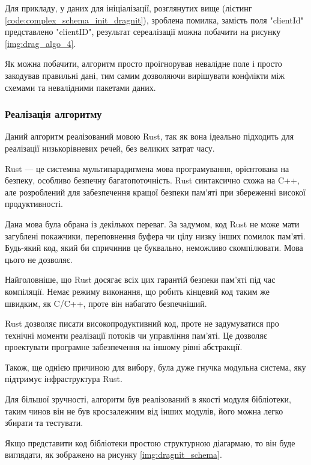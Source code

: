\documentclass{lib/styles/default-style}
\begin{document}
    Для прикладу, у даних для ініціалізації, розглянутих вище (лістинг \ref{code:complex_schema_init_dragnit}), зроблена помилка,
    замість поля "clientId" представлено "clientID", результат сереалізації можна побачити на рисунку \ref{img:drag_algo_4}.


    Як можна побачити, алгоритм просто проігнорував невалідне поле і просто закодував правильні дані, тим самим дозволяючи
    вирішувати конфлікти між схемами та невалідними пакетами даних.

    \subsubsection{Реалізація алгоритму}

    Даний алгоритм реалізований мовою Rust, так як вона ідеально підходить для реалізації низькорівневих речей, без великих затрат часу.

    Rust --- це системна мультипарадигмена мова програмування, орієнтована на безпеку, особливо безпечну багатопоточність. 
    Rust синтаксично схожа на C++, але розроблений для забезпечення кращої безпеки пам’яті при збереженні високої продуктивності.

    Дана мова була обрана із декількох переваг. За задумом, код Rust не може мати загублені покажчики,
    переповнення буфера чи цілу низку інших помилок пам'яті.
    Будь-який код, який би спричинив це буквально, неможливо скомпілювати.
    Мова цього не дозволяє.

    Найголовніше, що Rust досягає всіх цих гарантій безпеки пам’яті під час компіляції.
    Немає режиму виконання, що робить кінцевий код таким же швидким, як C/C++, проте він набагато безпечніший.

    Rust дозволяє писати високопродуктивний код, проте не задумуватися про технічні моменти реалізації потоків чи
    управління пам’яті. Це дозволяє проектувати програмне забезпечення на іншому рівні абстракції.

    Також, ще однією причиною для вибору, була дуже гнучка модульна система, яку підтримує інфраструктура Rust.

    Для більшої зручності, алгоритм був реалізований в якості модуля бібліотеки, таким чинов він не був кросзалежним від інших модулів,
    його можна легко збирати та тестувати.

    Якщо представити код бібліотеки простою структурною діагармаю, то він буде виглядати, як зображено на рисунку \ref{img:dragnit_schema}.
\end{document}
